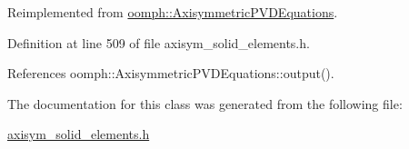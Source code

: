 Reimplemented from \hyperlink{classoomph_1_1AxisymmetricPVDEquations_a780e6e426869eec81758bf7396a54bad}{oomph\+::\+Axisymmetric\+P\+V\+D\+Equations}.



Definition at line 509 of file axisym\+\_\+solid\+\_\+elements.\+h.



References oomph\+::\+Axisymmetric\+P\+V\+D\+Equations\+::output().



The documentation for this class was generated from the following file\+:\begin{DoxyCompactItemize}
\item 
\hyperlink{axisym__solid__elements_8h}{axisym\+\_\+solid\+\_\+elements.\+h}\end{DoxyCompactItemize}
